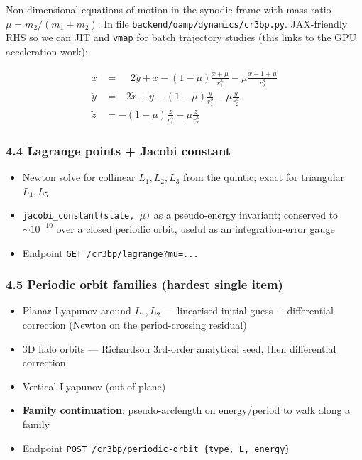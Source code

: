 \documentclass[11pt, a4paper]{article}
\begin{document}
Non-dimensional equations of motion in the synodic frame with mass ratio
$\mu = m_2/(m_1+m_2)$.  In file
\texttt{backend/oamp/dynamics/cr3bp.py}.  JAX-friendly RHS so we can JIT
and \texttt{vmap} for batch trajectory studies (this links to the GPU
acceleration work):

\begin{equation}
  \begin{aligned}
    \ddot x &= \phantom{-}2\dot y + x - (1-\mu)\frac{x+\mu}{r_1^3} - \mu\frac{x-1+\mu}{r_2^3} \\
    \ddot y &= -2\dot x + y - (1-\mu)\frac{y}{r_1^3} - \mu\frac{y}{r_2^3} \\
    \ddot z &= - (1-\mu)\frac{z}{r_1^3} - \mu\frac{z}{r_2^3}
  \end{aligned}
\end{equation}

\subsubsection{4.4 Lagrange points + Jacobi constant}

\begin{itemize}[leftmargin=*]
  \item Newton solve for collinear $L_1, L_2, L_3$ from the quintic;
        exact for triangular $L_4, L_5$
  \item \texttt{jacobi\_constant(state, $\mu$)} as a pseudo-energy invariant;
        conserved to $\sim 10^{-10}$ over a closed periodic orbit, useful
        as an integration-error gauge
  \item Endpoint \texttt{GET /cr3bp/lagrange?mu=...}
\end{itemize}

\subsubsection{4.5 Periodic orbit families (hardest single item)}

\begin{itemize}[leftmargin=*]
  \item Planar Lyapunov around $L_1, L_2$ --- linearised initial guess
        + differential correction (Newton on the period-crossing residual)
  \item 3D halo orbits --- Richardson 3rd-order analytical seed, then
        differential correction
  \item Vertical Lyapunov (out-of-plane)
  \item \textbf{Family continuation}: pseudo-arclength on energy/period to
        walk along a family
  \item Endpoint
        \texttt{POST /cr3bp/periodic-orbit \{type, L, energy\}}
\end{itemize}
\end{document}
